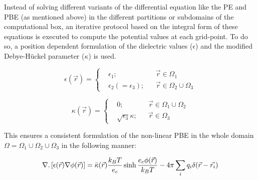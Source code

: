 \documentclass[9pt,tutorial,pubversion]{livecoms}
\begin{document}
Instead of solving different variants of the differential equation like the PE and PBE (as mentioned above) in the different partitions or subdomains of the computational box, an iterative protocol based on the integral form of these equations is executed to compute the potential values at each grid-point. To do so, a position dependent formulation of the dielectric values ($ \epsilon $) and the modified Debye-Hückel parameter ($ \kappa $) is used. 

\begin{equation}
  \epsilon(\Vec{r}) = \left \{
  \begin{aligned}
    &\epsilon_1; && \Vec{r} \in \Omega_1 \\
    &\epsilon_2 (=\epsilon_3) ; && \Vec{r} \in \Omega_2 \cup \Omega_3
  \end{aligned} \right.
\end{equation}

\begin{equation}
  \kappa(\Vec{r}) = \left \{
  \begin{aligned}
    &0; && \Vec{r} \in \Omega_1 \cup \Omega_2 \\
    & \sqrt{\epsilon_3}\kappa ; && \Vec{r} \in \Omega_3
  \end{aligned} \right.
\end{equation}

This ensures a consistent formulation of the non-linear PBE in the whole domain $ \Omega = \Omega_1 \cup \Omega_2 \cup \Omega_3 $ in the following manner:

\begin{equation}
    \nabla.\left[\epsilon(\Vec{r})\nabla\phi(\Vec{r})\right] = \Bar{\kappa}(\Vec{r})\frac{k_BT}{e_c}\sinh{\frac{e_c\phi(\Vec{r})}{k_BT}} - 4\pi\sum_{i} {q_i \delta(\Vec{r} - \Vec{r_i})}
\end{equation}
\end{document}
